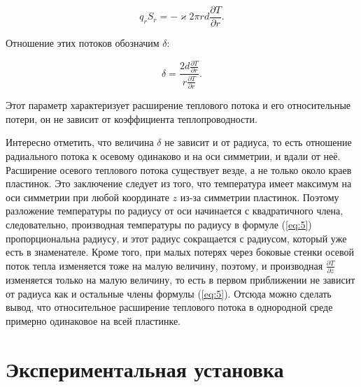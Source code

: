 \documentclass[a4paper,11.5pt]{article} %
\begin{document}
\begin{equation}
	q_rS_r=-\varkappa 2 \pi r d \frac{\partial T}{\partial r}.
	\label{eq:4}
\end{equation}

Отношение этих потоков обозначим $\delta$:

\begin{equation}
	\delta = \frac{2d\frac{\partial T}{\partial r}}{r \frac{\partial T}{\partial r}}.
	\label{eq:5}
\end{equation}

Этот параметр характеризует расширение теплового потока и его
относительные потери, он не зависит от коэффициента теплопроводности.

Интересно отметить, что величина $\delta$ не зависит и от радиуса, то есть отношение радиального потока к осевому одинаково и на оси симметрии, и вдали от неё. Расширение осевого теплового потока существует везде, а не только около краев пластинок. Это заключение следует из того, что температура имеет максимум на оси симметрии при любой координате $z$ из-за симметрии пластинок. Поэтому разложение температуры по радиусу от оси начинается с квадратичного члена, следовательно, производная температуры по радиусу в формуле (\ref{eq:5}) пропорциональна радиусу, и этот радиус сокращается с радиусом, который уже есть в знаменателе. Кроме того, при малых потерях через боковые стенки осевой поток тепла изменяется тоже на малую величину, поэтому, и производная $\frac{\partial T}{\partial z}$ изменяется только на малую величину, то есть в первом приближении не зависит от радиуса как и остальные члены формулы (\ref{eq:5}). Отсюда можно сделать вывод, что относительное расширение теплового потока в однородной среде примерно одинаковое на всей пластинке.

\section{Экспериментальная установка}
\end{document}

